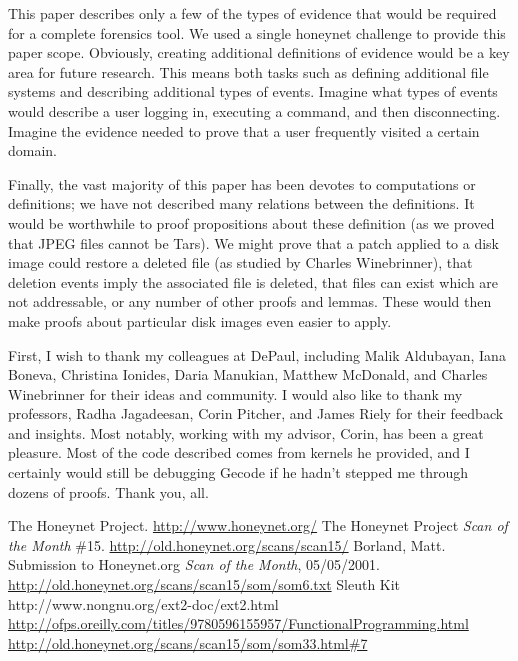 \documentclass[nocopyrightspace]{sigplanconf}
\begin{document}
This paper describes only a few of the types of evidence that would be
required for a complete forensics tool. We used a single honeynet challenge to
provide this paper scope. Obviously, creating additional definitions of
evidence would be a key area for future research. This means both tasks such
as defining additional file systems and describing additional types of events.
Imagine what types of events would describe a user logging in, executing a
command, and then disconnecting. Imagine the evidence needed to prove that a
user frequently visited a certain domain.

Finally, the vast majority of this paper has been devotes to computations or
definitions; we have not described many relations between the definitions. It
would be worthwhile to proof propositions about these definition (as we proved
that JPEG files cannot be Tars). We might prove that a patch applied to a disk
image could restore a deleted file (as studied by Charles Winebrinner), that
deletion events imply the associated file is deleted, that files can exist
which are not addressable, or any number of other proofs and lemmas. These
would then make proofs about particular disk images even easier to apply.

\appendix

\acks
First, I wish to thank my colleagues at DePaul, including Malik Aldubayan,
Iana Boneva, Christina Ionides, Daria Manukian, Matthew McDonald, and Charles
Winebrinner for their ideas and community. I would also like to thank my
professors, Radha Jagadeesan, Corin Pitcher, and James Riely for their
feedback and insights. Most notably, working with my advisor, Corin, has been
a great pleasure. Most of the code described comes from kernels he provided,
and I certainly would still be debugging Gecode if he hadn't stepped me
through dozens of proofs. Thank you, all.





\begin{thebibliography}{}
\softraggedright

  The Honeynet Project. \url{http://www.honeynet.org/}
  The Honeynet Project \emph{Scan of the Month} \#15.
  \url{http://old.honeynet.org/scans/scan15/}
  Borland, Matt. Submission to Honeynet.org \emph{Scan of the Month},
  05/05/2001. \url{http://old.honeynet.org/scans/scan15/som/som6.txt}
  Sleuth Kit
  http://www.nongnu.org/ext2-doc/ext2.html
  \url{http://ofps.oreilly.com/titles/9780596155957/FunctionalProgramming.html}
  \url{http://old.honeynet.org/scans/scan15/som/som33.html#7}

\end{thebibliography}
\end{document}
